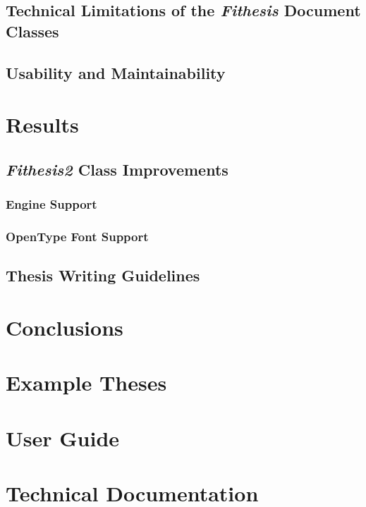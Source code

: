 \documentclass{article}
\begin{document}


  \subsection{Technical Limitations of the \emph{Fithesis} Document Classes}
  \subsection{Usability and Maintainability}
  \section{Results}
  \subsection{\emph{Fithesis2} Class Improvements}
  \subsubsection{ Engine Support}
  \subsubsection{OpenType Font Support}
  \subsection{Thesis Writing Guidelines}
  \section{Conclusions}
  \appendix
  \section{Example Theses}
  \section{User Guide}
  \section{Technical Documentation}

  \newpage
  {\footnotesize
  \singlespacing
  \nocite{*}
  }

  \newpage
  \printglossaries

  \printindex
\end{document}
